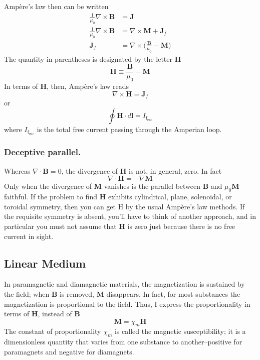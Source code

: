 \documentclass[../../../main.tex]{subfiles}
\begin{document}
Ampère’s law then can be written
\begin{align*}
    \frac{1}{\mu_0}\nabla\times \mathbf{B}&=\mathbf{J}\\
    \frac{1}{\mu_0}\nabla\times \mathbf{B}&=\nabla \times \mathbf{M}+\mathbf{J}_f\\
    \mathbf{J}_f&=\nabla\times\bigg(\frac{\mathbf{B}}{\mu_0}-\mathbf{M}\bigg)
\end{align*}
The quantity in parentheses is designated by the letter \textbf{H}
\begin{equation*}
    \mathbf{H}\equiv\frac{\mathbf{B}}{\mu_0}-\mathbf{M}
\end{equation*}
In terms of \textbf{H}, then, Ampère’s law reads
\begin{equation*}
    \nabla\times\mathbf{H}=\mathbf{J}_f
\end{equation*}
or
\begin{equation*}
    \oint \mathbf{H}\cdot d\mathbf{l}=I_{\text{f}_\text{enc}}
\end{equation*}
where $I_{\text{f}_\text{enc}}$ is the total free current passing through the Amperian loop.

\subsubsection{Deceptive parallel.} Whereas $\nabla \cdot \mathbf{B} = 0$, the divergence of \textbf{H} is not, in general, zero. In fact 
\begin{equation*}
    \nabla \cdot\mathbf{H}=-\nabla\mathbf{M}
\end{equation*}
Only when the divergence of \textbf{M} vanishes is the parallel between \textbf{B} and $\mu_0\mathbf{M}$ faithful. If the problem to find \textbf{H} exhibits cylindrical, plane, solenoidal, or toroidal symmetry, then you can get H by the usual Ampère’s law methods. If the requisite symmetry is absent, you’ll have to think of another approach, and in particular you must not assume that \textbf{H} is zero just because there is no free current in sight. 

\subsection{Linear Medium}
In paramagnetic and diamagnetic materials, the magnetization is sustained by the ﬁeld; when \textbf{B} is removed, \textbf{M} disappears. In fact, for most substances the magnetization is proportional to the ﬁeld. Thus, I express the proportionality in terms of \textbf{H}, instead of \textbf{B}
\begin{equation*}
    \mathbf{M}=\chi_m \mathbf{H}
\end{equation*}
The constant of proportionality $\chi_m$ is called the magnetic susceptibility; it is a dimensionless quantity that varies from one substance to another--positive for paramagnets and negative for diamagnets.
\end{document}
